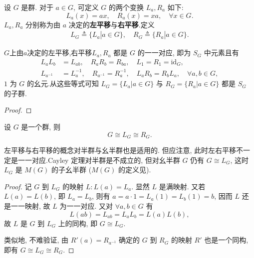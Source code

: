 \documentclass[../../main.tex]{subfiles}
\begin{document}
\begin{definition}
设 \( G \) 是群. 对于 \( a \in G \), 可定义 \( G \) 的两个变换 \( L_a, R_a \) 如下:
\[
L_a(x) = ax, \quad R_a(x) = xa, \quad \forall x \in G.
\]
\( L_a, R_a \) 分别称为由 \( a \) 决定的\textbf{左平移}与\textbf{右平移}.定义
\begin{align*}
L_G\triangleq \{L_a|a\in G\},\quad R_G\triangleq \{R_a|a\in G\}.
\end{align*}
\end{definition}

\begin{proposition}
$G$上由$a$决定的左平移,右平移\( L_a, R_a \) 都是 \( G \) 的一一对应, 即为 \( S_G \) 中元素且有
\begin{align*}
L_aL_b &= L_{ab}, \quad R_aR_b = R_{ba}, \quad L_1 = R_1 = \text{id}_G, \\
L_{a^{-1}} &= L_a^{-1}, \quad R_{a^{-1}} = R_a^{-1}, \quad L_aR_b = R_bL_a, \quad \forall a,b \in G,
\end{align*}
\( 1 \) 为 \( G \) 的幺元.从这些等式可知 \( L_G = \{L_a|a \in G\} \) 与 \( R_G = \{R_a|a \in G\} \) 都是 \( S_G \) 的子群.
\end{proposition}
\begin{proof}


\end{proof}

\begin{theorem}[Cayley定理]\label{theorem:抽象代数-Cayley定理-定理 1.5.1}
设 \( G \) 是一个群, 则
\[
G \cong L_G \cong R_G.
\]
\end{theorem}
\begin{remark}
左平移与右平移的概念对半群与幺半群也是适用的. 但应注意, 此时左右平移不一定是一一对应.Cayley 定理对半群是不成立的, 但对幺半群 \( G \) 仍有 \( G \cong L_G \), 这时 \( L_G \) 是 \( M(G) \) 的子幺半群 (\( M(G) \) 的定义见).
\end{remark}
\begin{proof}
记 \( G \) 到 \( L_G \) 的映射 \( L: L(a) = L_a \). 显然 \( L \) 是满映射. 又若 \( L(a) = L(b) \), 即 \( L_a = L_b \), 则有 \( a = a \cdot 1 = L_a(1) = L_b(1) = b \), 因而 \( L \) 还是一一映射, 故 \( L \) 为一一对应. 又对 \( \forall a,b \in G \) 有
\[
L(ab) = L_{ab} = L_aL_b = L(a)L(b),
\]
故 \( L \) 是 \( G \) 到 \( L_G \) 上的同构, 即 \( G \cong L_G \).

类似地, 不难验证, 由 \( R'(a) = R_{a^{-1}} \) 确定的 \( G \) 到 \( R_G \) 的映射 \( R' \) 也是一个同构, 即有 \( G \cong L_G \cong R_G \).

\end{proof}
\end{document}
